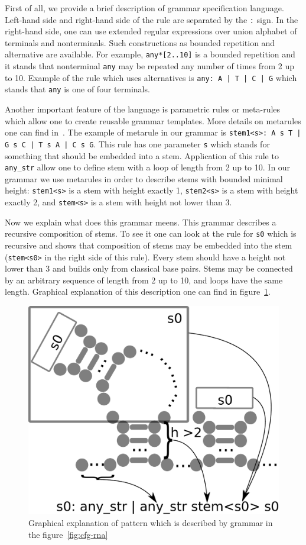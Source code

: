 \documentclass[a4paper,twoside]{article}
\begin{document}
First of all, we provide a brief description of grammar specification language.
Left-hand side and right-hand side of the rule are separated by the \verb|:| sign.
In the right-hand side, one can use extended regular expressions over union alphabet of terminals and nonterminals.
Such constructions as bounded repetition and alternative are available.
For example, \verb|any*[2..10]| is a bounded repetition and it stands that nonterminal \verb|any| may be repeated any number of times from 2 up to 10.
Example of the rule which uses alternatives is \texttt{any: A | T | C | G} which stands that \verb|any| is one of four terminals.

Another important feature of the language is parametric rules or meta-rules which allow one to create reusable grammar templates.
More details on metarules one can find in~\cite{Thiemann:2008:MCG:1389449.1389465}.
The example of metarule in our grammar is \texttt{stem1<s>: A s T | G s C | T s A | C s G}.
This rule has one parameter \verb|s| which stands for something that should be embedded into a stem.
Application of this rule to \verb|any_str| allow one to define stem with a loop of length from 2 up to 10.
In our grammar we use metarules in order to describe stems with bounded minimal height: \verb|stem1<s>| is a stem with height exactly 1,  \verb|stem2<s>| is a stem with height exactly 2, and \verb|stem<s>| is a stem with height not lower than 3.

Now we explain what does this grammar meens.
This grammar describes a recursive composition of stems.
To see it one can look at the rule for \verb|s0| which is recursive and shows that composition of stems may be embedded into the stem (\verb |stem<s0>| in the right side of this rule).
Every stem should have a height not lower than 3 and builds only from classical base pairs.
Stems may be connected by an arbitrary sequence of length from 2 up to 10, and loops have the same length.
Graphical explanation of this description one can find in figure~\ref{fig:cfg-rna-graphical}.

\begin{figure}
\centering
\includegraphics[width=.45\textwidth]{figures/16sgrammar.pdf}
\caption{Graphical explanation of pattern which is described by grammar in the figure~\ref{fig:cfg-rna}}
\label{fig:cfg-rna-graphical}
\end{figure}
\end{document}
